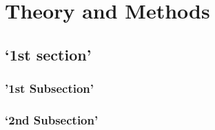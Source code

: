 \chapter{Theory and Methods}
\label{sec-theory}


\section{`1st section'}
\label{chapter_2_fo_ldg}

\subsection{'1st Subsection'}
\label{FO_theory}



\subsection{`2nd Subsection'}
\label{LdG_theory}

	

